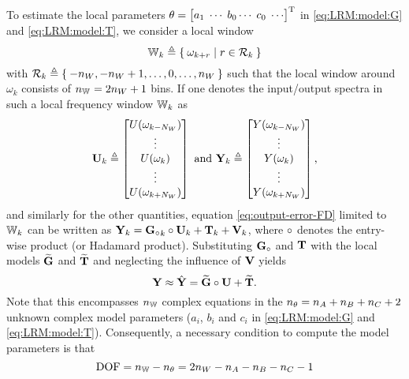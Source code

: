 To estimate the local parameters $\LocalVector{\theta} = \mat{a_1\; \cdots\; b_0 \cdots\; c_0\; \cdots}^{\T}$ in \eqref{eq:LRM:model:G} and \eqref{eq:LRM:model:T}, we consider a local window
\begin{equation}
  \LocalWindow[k] 
  \isdef
  \Set{
    \omega_{k+r} 
    | 
    r \in \LocalShifts{k}
  }
\end{equation}
with $\LocalShifts{k} \isdef \Set{-\numel{W}, -\numel{W}+1, \ldots, 0, \ldots, \numel{W}}$
such that the local window around $\omega_k$ consists of $\numel{\LocalWindow} = 2 \numel{W} + 1$ bins. 
If one denotes the input/output spectra in such a local frequency window $\LocalWindow[k]$ as
\begin{equation}
  \LocalVector{U}_k \isdef 
  \mat{
    U(\omega_{k-N_W})\\
    \vdots\\
    U(\omega_{k})\\
    \vdots\\
    U(\omega_{k+N_W})\\
  }
  \text{ and }
  \LocalVector{Y}_k \isdef 
  \mat{
    Y(\omega_{k-N_W})\\
    \vdots\\
    Y(\omega_{k})\\
    \vdots\\
    Y(\omega_{k+N_W})\\
  }
  \text{,}
\end{equation}
and similarly for the other quantities, equation \eqref{eq:output-error-FD} limited to $\LocalWindow[k]$ can be written as
$
  \LocalVector{Y}_k  = {\true{\LocalVector{G}}}_k \hadamard \LocalVector{U}_k + \LocalVector{T}_k + \LocalVector{V}_k
$, where $\hadamard$ denotes the entry-wise product (or Hadamard product).
Substituting $\true{\LocalVector{G}}$ and $\LocalVector{T}$ with the local models $\LocalModel{G}$ and $\LocalModel{T}$ and neglecting the influence of $\LocalVector{V}$ yields
\begin{equation}
  \LocalVector{Y} 
  \approx 
  \hat{\LocalVector{Y}} 
    =
      \LocalModel{G} \hadamard \LocalVector{U} + \LocalModel{T}
      \text{.}
      \label{eq:local-system-equations}
\end{equation}
Note that this encompasses $\numel{\Window}$ complex equations in the $\numel{\theta} = \numel{A} + \numel{B} + \numel{C} + 2$  unknown complex model parameters ($a_i$, $b_i$ and $c_i$ in \eqref{eq:LRM:model:G} and \eqref{eq:LRM:model:T}).
Consequently, a necessary condition to compute the model parameters is that
\begin{equation}
  \DOF = \numel{\Window} - \numel{\theta}
       = 2 \numel{W} - \numel{A} - \numel{B} - \numel{C} - 1
\end{equation}
